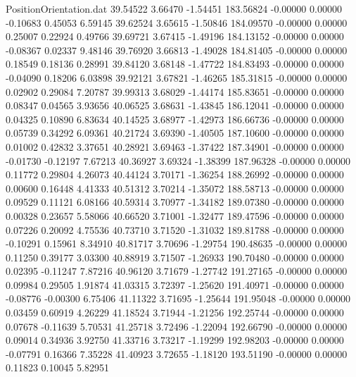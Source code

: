 \begin{filecontents}{PositionOrientation.dat}
  39.54522    3.66470   -1.54451   183.56824   -0.00000    0.00000   -0.10683    0.45053    6.59145
  39.62524    3.65615   -1.50846   184.09570   -0.00000    0.00000    0.25007    0.22924    0.49766
  39.69721    3.67415   -1.49196   184.13152   -0.00000    0.00000   -0.08367    0.02337    9.48146
  39.76920    3.66813   -1.49028   184.81405   -0.00000    0.00000    0.18549    0.18136    0.28991
  39.84120    3.68148   -1.47722   184.83493   -0.00000    0.00000   -0.04090    0.18206    6.03898
  39.92121    3.67821   -1.46265   185.31815   -0.00000    0.00000    0.02902    0.29084    7.20787
  39.99313    3.68029   -1.44174   185.83651   -0.00000    0.00000    0.08347    0.04565    3.93656
  40.06525    3.68631   -1.43845   186.12041   -0.00000    0.00000    0.04325    0.10890    6.83634
  40.14525    3.68977   -1.42973   186.66736   -0.00000    0.00000    0.05739    0.34292    6.09361
  40.21724    3.69390   -1.40505   187.10600   -0.00000    0.00000    0.01002    0.42832    3.37651
  40.28921    3.69463   -1.37422   187.34901   -0.00000    0.00000   -0.01730   -0.12197    7.67213
  40.36927    3.69324   -1.38399   187.96328   -0.00000    0.00000    0.11772    0.29804    4.26073
  40.44124    3.70171   -1.36254   188.26992   -0.00000    0.00000    0.00600    0.16448    4.41333
  40.51312    3.70214   -1.35072   188.58713   -0.00000    0.00000    0.09529    0.11121    6.08166
  40.59314    3.70977   -1.34182   189.07380   -0.00000    0.00000    0.00328    0.23657    5.58066
  40.66520    3.71001   -1.32477   189.47596   -0.00000    0.00000    0.07226    0.20092    4.75536
  40.73710    3.71520   -1.31032   189.81788   -0.00000    0.00000   -0.10291    0.15961    8.34910
  40.81717    3.70696   -1.29754   190.48635   -0.00000    0.00000    0.11250    0.39177    3.03300
  40.88919    3.71507   -1.26933   190.70480   -0.00000    0.00000    0.02395   -0.11247    7.87216
  40.96120    3.71679   -1.27742   191.27165   -0.00000    0.00000    0.09984    0.29505    1.91874
  41.03315    3.72397   -1.25620   191.40971   -0.00000    0.00000   -0.08776   -0.00300    6.75406
  41.11322    3.71695   -1.25644   191.95048   -0.00000    0.00000    0.03459    0.60919    4.26229
  41.18524    3.71944   -1.21256   192.25744   -0.00000    0.00000    0.07678   -0.11639    5.70531
  41.25718    3.72496   -1.22094   192.66790   -0.00000    0.00000    0.09014    0.34936    3.92750
  41.33716    3.73217   -1.19299   192.98203   -0.00000    0.00000   -0.07791    0.16366    7.35228
  41.40923    3.72655   -1.18120   193.51190   -0.00000    0.00000    0.11823    0.10045    5.82951

\end{filecontents}
